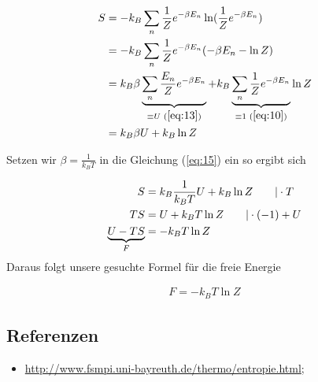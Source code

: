 \begin{align}
  \label{eq:15}
  S &= -k_B \sum_n \frac{1}{Z}e^{-\beta E_n} \ln(\frac{1}{Z}e^{-\beta E_n}) \notag\\
&= -k_B \sum_n \frac{1}{Z}e^{-\beta E_n} (-\beta E_n - \ln Z ) \notag\\
&= k_B \beta \underbr{\sum_n \frac{E_n}{Z}e^{-\beta E_n}}_{\equiv U\,\, (\ref{eq:13})} + k_B \underbr{\sum_n \frac{1}{Z}e^{-\beta E_n}}_{\equiv 1\,\, (\ref{eq:10})} \ln Z  \notag\\
&= k_B \beta U + k_B \ln Z
\end{align}

Setzen wir \(\beta=\frac{1}{k_B T}\) in die Gleichung (\ref{eq:15}) ein so ergibt sich

\begin{align}
  \label{eq:16}
S &= k_B \frac{1}{k_B T} U + k_B \ln Z \qquad |\cdot T \notag \\
TS &=  U + k_B T \ln Z \qquad |\cdot (-1) +U \notag \\
\underbr{U - TS}_{F} &= - k_B T\ln Z 
\end{align}
Daraus folgt unsere gesuchte Formel für die freie Energie

\begin{align}
  \label{eq:17}
  \boxed{ F= - k_BT\ln Z }
\end{align}




\subsection*{Referenzen}


\begin{itemize}
\item \url{http://www.fsmpi.uni-bayreuth.de/thermo/entropie.html};
\end{itemize}


